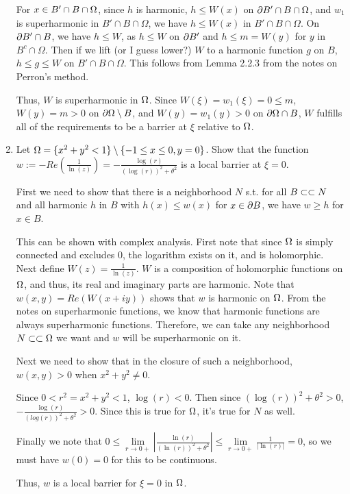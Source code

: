 \begin{enumerate}
  For $x \in B' \cap B \cap \Omega$, since $h$ is harmonic, $h \leq W(x)$ on $\partial B' \cap B \cap \Omega$,
  and $w_1$ is superharmonic in $B' \cap B \cap \Omega$, we have $h \leq W(x)$ in $B' \cap B \cap \Omega$.
  On $\partial B' \cap B$, we have $h \leq W$, as $h \leq W$ on $\partial B'$ and $h \leq m = W(y)$ for $y$ in $B^c \cap \Omega$.
  Then if we lift (or I guess lower?) $W$ to a harmonic function $g$ on $B$, $h \leq g \leq W$ on $B' \cap B \cap \Omega$.
  This follows from Lemma 2.2.3 from the notes on Perron's method.

  Thus, $W$ is superharmonic in $\Omega$.
  Since $W(\xi) = w_1(\xi) = 0 \leq m$, $W(y) = m > 0$ on $\partial \Omega \setminus B$, and $W(y) = w_1(y) > 0$ on $\partial \Omega \cap B$,
  $W$ fulfills all of the requirements to be a barrier at $\xi$ relative to $\Omega$.

\item
  Let $\Omega = \{ x^2 + y^2 < 1 \} \setminus \{ -1 \leq x \leq 0, y = 0 \}$.
  Show that the function $w := -Re\left( \frac{1}{\ln(z)} \right) = - \frac{\log(r)}{(\log(r))^2 + \theta^2}$ is a local barrier at $\xi = 0$.

  First we need to show that there is a neighborhood $N$ s.t.
  for all $B \subset \subset N$ and all harmonic $h$ in $B$ with $h(x) \leq w(x)$ for $x \in \partial B$,
  we have $w \geq h$ for $x \in B$.

  This can be shown with complex analysis.
  First note that since $\Omega$ is simply connected and excludes $0$, the logarithm exists on it, and is holomorphic.
  Next define $W(z) = \frac{1}{\ln(z)}$.
  $W$ is a composition of holomorphic functions on $\Omega$, and thus, its real and imaginary parts are harmonic.
  Note that $w(x, y) = Re(W(x + i y))$ shows that $w$ is harmonic on $\Omega$.
  From the notes on superharmonic functions, we know that harmonic functions are always superharmonic functions.
  Therefore, we can take any neighborhood $N \subset \subset \Omega$ we want and $w$ will be superharmonic on it.

  Next we need to show that in the closure of such a neighborhood, $w(x, y) > 0$ when $x^2 + y^2 \neq 0$.

  Since $0 < r^2 = x^2 + y^2 < 1$, $\log \left( r \right) < 0$.
  Then since $(\log(r))^2 + \theta^2 > 0$, $-\frac{\log(r)}{(log(r))^2 + \theta^2} > 0$.
  Since this is true for $\Omega$, it's true for $N$ as well.

  Finally we note that $0 \leq \lim \limits_{r \rightarrow 0+} \left| \frac{\ln(r)}{(\ln(r))^2 + \theta^2} \right| \leq \lim \limits_{r \rightarrow 0+} \frac{1}{|\ln(r)|} = 0$,
  so we must have $w(0) = 0$ for this to be continuous.

  Thus, $w$ is a local barrier for $\xi = 0$ in $\Omega$.
\end{enumerate}
